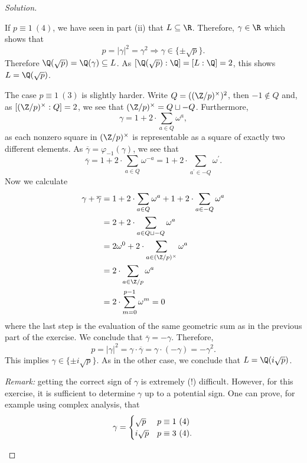 \documentclass[a4paper,10pt,reqno]{amsart}
\newenvironment{sol}
  {\renewcommand\qedsymbol{$\blacksquare$}\begin{proof}[Solution]}
  {\end{proof}}
\begin{document}
\begin{sol}
\begin{enumerate}[label=(\roman*)]
    If $p \equiv 1 \ (4)$, we have seen in part (ii) that $L \subseteq \R$. Therefore, $\gamma \in \R$ which shows that
    \[
    p = |\gamma|^2 = \gamma^2 \Rightarrow \gamma \in \{ \pm \sqrt{p} \}.
    \]
    Therefore $\Q(\sqrt{p}) = \Q(\gamma) \subseteq L$. As $[\Q(\sqrt{p}):\Q] = [L:\Q] = 2$, this shows $L = \Q(\sqrt{p})$.

    The case $p \equiv 1 \ (3)$ is slightly harder. Write $Q = ((\Z/p)^{\times})^2$, then $-1 \not \in Q$ and, as $[(\Z/p)^{\times}:Q] = 2$, we see that $(\Z/p)^{\times} = Q \sqcup -Q$. Furthermore,
    \[
    \gamma = 1 + 2 \cdot \sum_{a \in Q} \omega^a,
    \]
    as each nonzero square in $(\Z/p)^{\times}$ is representable as a square of exactly two different elements. As $\overline{\gamma} = \varphi_{-1}(\gamma)$, we see that
    \[
    \overline{\gamma} = 1 + 2 \cdot \sum_{a \in Q} \omega^{-a} = 1 + 2 \cdot \sum_{a^{\prime} \in -Q} \omega^{\prime}.
    \]
    Now we calculate
    \begin{align*}
    \gamma + \overline{\gamma} & = 1 + 2 \cdot \sum_{a \in Q} \omega^a + 1 + 2 \cdot \sum_{a \in -Q} \omega^a \\
    & = 2 + 2 \cdot \sum_{a \in Q \sqcup -Q} \omega^a \\
    & = 2 \omega^0 + 2 \cdot \sum_{a \in (\Z/p)^{\times}} \omega^a \\
    & = 2 \cdot \sum_{a \in \Z/p} \omega^a \\
    & = 2 \cdot \sum_{m = 0}^{p-1} \omega^m = 0
    \end{align*}
    where the last step is the evaluation of the same geometric sum as in the previous part of the exercise. We conclude that $\overline{\gamma} = - \gamma$. Therefore,
    \[
    p = |\gamma|^2 = \gamma \cdot \overline{\gamma} = \gamma \cdot (-\gamma) = -\gamma^2.
    \]
    This implies $\gamma \in \{ \pm i \sqrt{p} \}$. As in the other case, we conclude that $L = \Q(i \sqrt{p})$.

    \medskip

    \noindent \textit{Remark:} getting the correct sign of $\gamma$ is extremely (!) difficult. However, for this exercise, it is sufficient to determine $\gamma$ up to a potential sign. One can prove, for example using complex analysis, that
    \[
    \gamma = \begin{cases}
    \sqrt{p} & p \equiv 1 \ (4) \\
    i\sqrt{p} & p \equiv 3 \ (4).
    \end{cases}\qedhere
    \]
    \end{enumerate}
\end{sol}
\end{document}

